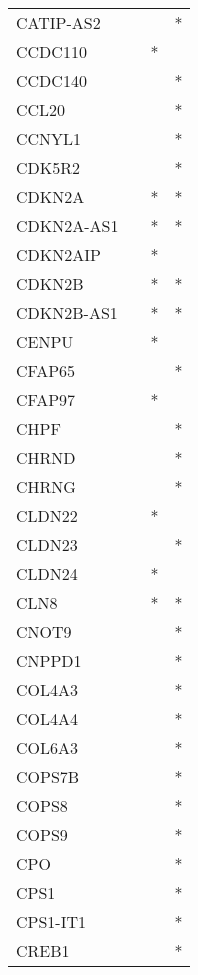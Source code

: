 \begin{longtable}{lccc}
CATIP-AS2      &       &    &       * \\
CCDC110        &       &  * &         \\
CCDC140        &       &    &       * \\
CCL20          &       &    &       * \\
CCNYL1         &       &    &       * \\
CDK5R2         &       &    &       * \\
CDKN2A         &       &  * &       * \\
CDKN2A-AS1     &       &  * &       * \\
CDKN2AIP       &       &  * &         \\
CDKN2B         &       &  * &       * \\
CDKN2B-AS1     &       &  * &       * \\
CENPU          &       &  * &         \\
CFAP65         &       &    &       * \\
CFAP97         &       &  * &         \\
CHPF           &       &    &       * \\
CHRND          &       &    &       * \\
CHRNG          &       &    &       * \\
CLDN22         &       &  * &         \\
CLDN23         &       &    &       * \\
CLDN24         &       &  * &         \\
CLN8           &       &  * &       * \\
CNOT9          &       &    &       * \\
CNPPD1         &       &    &       * \\
COL4A3         &       &    &       * \\
COL4A4         &       &    &       * \\
COL6A3         &       &    &       * \\
COPS7B         &       &    &       * \\
COPS8          &       &    &       * \\
COPS9          &       &    &       * \\
CPO            &       &    &       * \\
CPS1           &       &    &       * \\
CPS1-IT1       &       &    &       * \\
CREB1          &       &    &       * \\

\end{longtable}
